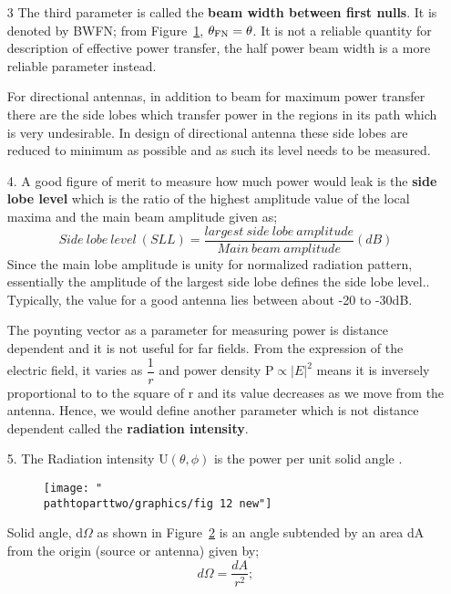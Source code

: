 \begin{enumerate}
Also there is a third parameter which answers to the question of what is the effective angle over which the radiation goes? If we accept the variations of electric fields within the sector but provided radiation does not go to zero, the choice would be the first nulls on either sides of the main beam and then the beam width would be $\theta$ from Figure~\ref{figure11}

\begin{figure}[h]
\centering
\texttt{[image: "\\pathtoparttwo/graphics/fig 11 new"]}
\label{figure11}
\end{figure}
\item[3]The third parameter is called the \textbf{beam width between first nulls}. It is denoted by BWFN; from Figure~\ref{figure11}, $\theta_{\textnormal{FN}}=\theta$. It is not a reliable quantity for description of effective power transfer, the half power beam width is a more reliable parameter instead.

For directional antennas, in addition to beam for maximum power transfer there are the side lobes which transfer power in the regions in its path which is very undesirable. In design of directional antenna these side lobes are reduced to minimum as possible and as such its level needs to be measured.
\item[4.]A good figure of merit to measure how much power would leak is the \textbf{side lobe level} which is the ratio of the highest amplitude value of the local maxima and the main beam amplitude given as;
$$ Side\ lobe\ level\ (SLL)=\frac{largest\ side\ lobe\ amplitude}{Main\ beam\ amplitude}(dB)$$
Since the main lobe amplitude is unity for normalized radiation pattern, essentially the amplitude of the largest side lobe defines the side lobe level.. Typically, the value for a good antenna lies between about -20 to -30dB.

The poynting vector as a parameter for measuring power is distance dependent and it is not useful for far fields. From the expression of the electric field, it varies as $\dfrac{1}{r}$ and power density P$\propto |E|^{2}$ means it is inversely proportional to to the square of  r and its value decreases as we move from the antenna. Hence, we would define another parameter which is not distance dependent called the \textbf{radiation intensity}.
\item[5.] The Radiation intensity U$(\theta, \phi)$ is the power per unit solid angle .

\begin{figure}[h]
\centering
\texttt{[image: "\\pathtoparttwo/graphics/fig 12 new"]}
\label{figure12}
\end{figure}
Solid angle, d$\Omega$ as shown in Figure~\ref{figure12} is an angle subtended by an area dA from the origin (source or antenna) given by;$$d\Omega=\frac{dA}{r^{2}};$$


\end{enumerate}
